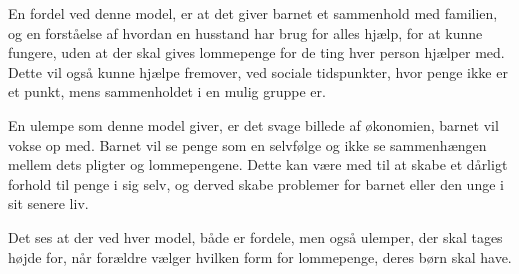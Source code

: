 En fordel ved denne model, er at det giver 
barnet et sammenhold med familien, og en 
forståelse af hvordan en husstand har brug for 
alles hjælp, for at kunne fungere, uden at der 
skal gives lommepenge for de ting hver person 
hjælper med. Dette vil også kunne hjælpe 
fremover, ved sociale tidspunkter, hvor penge 
ikke er et punkt, mens sammenholdet i en mulig 
gruppe er.

En ulempe som denne model giver, er det svage 
billede af økonomien, barnet vil vokse op med. 
Barnet vil se penge som en selvfølge og ikke se 
sammenhængen mellem dets pligter og 
lommepengene. Dette kan være med til at skabe et 
dårligt forhold til penge i sig selv, og derved 
skabe problemer for barnet eller den unge i sit 
senere liv.

Det ses at der ved hver model, både er fordele, 
men også ulemper, der skal tages højde for, når 
forældre vælger hvilken form for lommepenge, 
deres børn skal have.


